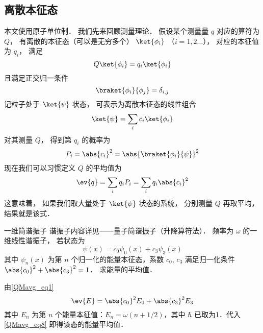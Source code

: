 

\subsection{离散本征态}

本文使用原子单位制． 我们先来回顾测量理论． 假设某个测量量 $q$ 对应的算符为 $Q$， 有离散的本征态（可以是无穷多个） $\ket{\phi_i}$ （$i = 1,2\dots$）， 对应的本征值为 $q_i$， 满足
\begin{equation}\label{QMavg_eq3}
Q\ket{\phi_i} = q_i \ket{\phi_i}
\end{equation}
且满足正交归一条件
\begin{equation}\label{QMavg_eq4}
\braket{\phi_i}{\phi_j} = \delta_{i,j}
\end{equation}
记粒子处于 $\ket{\psi}$ 状态， 可表示为离散本征态的线性组合
\begin{equation}\label{QMavg_eq2}
\ket{\psi} = \sum_i c_i \ket{\phi_i}
\end{equation}
对其测量 $Q$， 得到第 $q_i$ 的概率为
\begin{equation}
P_i = \abs{c_i}^2 = \abs{\braket{\phi_i}{\psi}}^2
\end{equation}
现在我们可以习惯定义 $Q$ 的平均值为
\begin{equation}\label{QMavg_eq1}
\ev{q} = \sum_i q_i P_i = \sum_i q_i \abs{c_i}^2
\end{equation}
这意味着， 如果我们取大量处于 $\ket{\psi}$ 状态的系统， 分别测量 $Q$ 再取平均， 结果就是该式．

\begin{example}{一维简谐振子}
谐振子内容详见——量子简谐振子（升降算符法）． 频率为 $\omega$ 的一维线性谐振子， 若状态为
\begin{equation}
\psi(x)=c_0 \psi_0(x)+c_3\psi_3(x)
\end{equation}
其中 $\psi_n(x)$ 为第 $n$ 个归一化的能量本征态，系数 $c_0$, $c_3$ 满足归一化条件 $\abs{c_0}^2+\abs{c_3}^2 = 1$． 求能量的平均值．

由\autoref{QMavg_eq1}
\begin{equation}\label{QMavg_eq8}
\ev{E}=\abs{c_0}^2 E_0+\abs{c_3}^2 E_3
\end{equation}
其中 $E_n$ 为第 $n$ 个能量本征值：$E_n=\omega(n+1/2)$，其中 $\hbar$ 已取为1．代入\autoref{QMavg_eq8} 即得该态的能量平均值．
\end{example}


